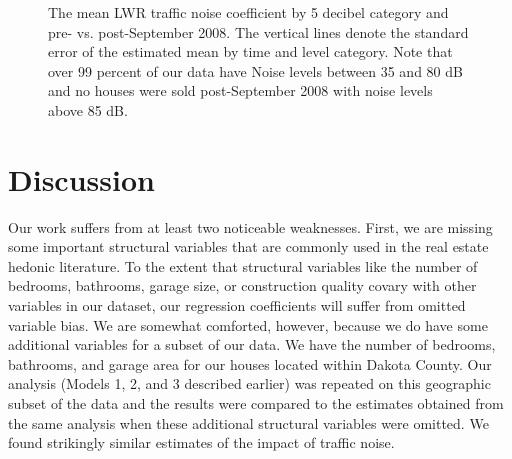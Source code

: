 \documentclass{article}\usepackage{graphicx, color}
\begin{document}
\begin{figure}
\caption{The mean LWR traffic noise coefficient by 5 decibel category and pre- vs. post-September 2008. The vertical lines denote the standard error of the estimated mean by time and level category. Note that over 99 percent of our data have Noise levels between 35 and 80 dB and no houses were sold post-September 2008 with noise levels above 85 dB.}\label{fig:betaMAXvCat}
\end{figure}


\section{Discussion}

Our work suffers from at least two noticeable weaknesses. First, we are missing some important structural variables that are commonly used in the real estate hedonic literature. To the extent that structural variables like the number of bedrooms, bathrooms, garage size, or construction quality covary with other variables in our dataset, our regression coefficients will suffer from omitted variable bias. We are somewhat comforted, however, because we do have some additional variables for a subset of our data. We have the number of bedrooms, bathrooms, and garage area for our houses located within Dakota County. Our analysis (Models 1, 2, and 3 described earlier) was repeated on this geographic subset of the data and the results were compared to the estimates obtained from the same analysis when these additional structural variables were omitted. We found strikingly similar estimates of the impact of traffic noise.
\end{document}
